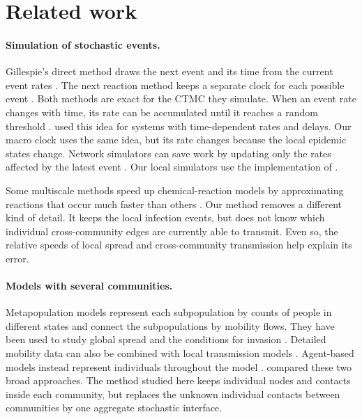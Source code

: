 \documentclass[a4paper,fleqn]{cas-sc}
\begin{document}
\section{Related work}
\label{sec:related}

\paragraph{Simulation of stochastic events.}
Gillespie's direct method draws the next event and its time from the current event rates \citep{gillespie1977exact}. The next reaction method keeps a separate clock for each possible event \citep{gibson2000}. Both methods are exact for the CTMC they simulate. When an event rate changes with time, its rate can be accumulated until it reaches a random threshold \citep{ethier1986}. \citet{anderson2007} used this idea for systems with time-dependent rates and delays. Our macro clock uses the same idea, but its rate changes because the local epidemic states change. Network simulators can save work by updating only the rates affected by the latest event \citep{vestergaard2015,kuryliak2025simulating}. Our local simulators use the implementation of \citet{kuryliak2025simulating}.

Some multiscale methods speed up chemical-reaction models by approximating reactions that occur much faster than others \citep{haseltine2002,cao2005slow}. Our method removes a different kind of detail. It keeps the local infection events, but does not know which individual cross-community edges are currently able to transmit. Even so, the relative speeds of local spread and cross-community transmission help explain its error.

\paragraph{Models with several communities.}
Metapopulation models represent each subpopulation by counts of people in different states and connect the subpopulations by mobility flows. They have been used to study global spread and the conditions for invasion \citep{colizza2007reaction,colizza2008,balcan2009,balcan2010modeling}. Detailed mobility data can also be combined with local transmission models \citep{chang2021}. Agent-based models instead represent individuals throughout the model \citep{eubank2004,kerr2021}. \citet{ajelli2010} compared these two broad approaches. The method studied here keeps individual nodes and contacts inside each community, but replaces the unknown individual contacts between communities by one aggregate stochastic interface.
\end{document}
